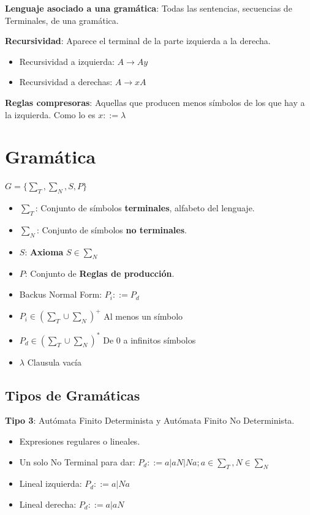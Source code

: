 \documentclass[12pt, twoside, openright]{report} %
\begin{document}
\textbf{Lenguaje asociado a una gramática}: Todas las sentencias, secuencias de Terminales, de una gramática.

\textbf{Recursividad}: Aparece el terminal de la parte izquierda a la derecha.

\begin{itemize}
\item
  Recursividad a izquierda: $A \rightarrow Ay$
\item
  Recursividad a derechas: $A \rightarrow xA$
\end{itemize}

\textbf{Reglas compresoras}: Aquellas que producen menos símbolos de los
que hay a la izquierda. Como lo es \(x::= \lambda\)

\section{Gramática}

\(G=\{ \sum_T, \sum_N, S, P\}\)

\begin{itemize}
\item
  \(\sum_T\): Conjunto de símbolos \textbf{terminales}, alfabeto del
  lenguaje.
\item
  \(\sum_N\): Conjunto de símbolos \textbf{no terminales}.
\item
  \(S\): \textbf{Axioma} \(S \in \sum_N\)
\item
  \(P\): Conjunto de \textbf{Reglas de producción}.
\item
  Backus Normal Form: \(P_i ::= P_d\)
\item
  \(P_i \in (\sum_T \cup \sum_N)^+\) Al menos un símbolo
\item
  \(P_d \in (\sum_T \cup \sum_N)^*\) De 0 a infinitos símbolos
\item
  \(\lambda\) Clausula vacía
\end{itemize}


\subsection{Tipos de Gramáticas}

\textbf{Tipo 3}: Autómata Finito Determinista y Autómata Finito No
Determinista.

\begin{itemize}
\item
  Expresiones regulares o lineales.
\item
  Un solo No Terminal para dar:
  \(P_d ::= a | aN | Na; a \in \sum_T, N \in \sum_N\)
\item
  Lineal izquierda: \(P_d ::= a | Na\)
\item
  Lineal derecha: \(P_d ::= a | aN\)
\end{itemize}
\end{document}

